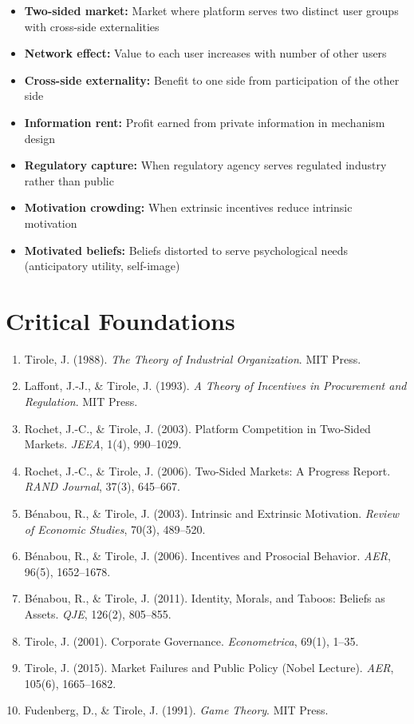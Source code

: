 \begin{itemize}
    \item \textbf{Two-sided market:} Market where platform serves two distinct user groups with cross-side externalities
    \item \textbf{Network effect:} Value to each user increases with number of other users
    \item \textbf{Cross-side externality:} Benefit to one side from participation of the other side
    \item \textbf{Information rent:} Profit earned from private information in mechanism design
    \item \textbf{Regulatory capture:} When regulatory agency serves regulated industry rather than public
    \item \textbf{Motivation crowding:} When extrinsic incentives reduce intrinsic motivation
    \item \textbf{Motivated beliefs:} Beliefs distorted to serve psychological needs (anticipatory utility, self-image)
\end{itemize}

\section{Critical Foundations}
\label{sec:jt-foundations}

\begin{enumerate}
    \item Tirole, J. (1988). \textit{The Theory of Industrial Organization}. MIT Press.
    \item Laffont, J.-J., \& Tirole, J. (1993). \textit{A Theory of Incentives in Procurement and Regulation}. MIT Press.
    \item Rochet, J.-C., \& Tirole, J. (2003). Platform Competition in Two-Sided Markets. \textit{JEEA}, 1(4), 990--1029.
    \item Rochet, J.-C., \& Tirole, J. (2006). Two-Sided Markets: A Progress Report. \textit{RAND Journal}, 37(3), 645--667.
    \item Bénabou, R., \& Tirole, J. (2003). Intrinsic and Extrinsic Motivation. \textit{Review of Economic Studies}, 70(3), 489--520.
    \item Bénabou, R., \& Tirole, J. (2006). Incentives and Prosocial Behavior. \textit{AER}, 96(5), 1652--1678.
    \item Bénabou, R., \& Tirole, J. (2011). Identity, Morals, and Taboos: Beliefs as Assets. \textit{QJE}, 126(2), 805--855.
    \item Tirole, J. (2001). Corporate Governance. \textit{Econometrica}, 69(1), 1--35.
    \item Tirole, J. (2015). Market Failures and Public Policy (Nobel Lecture). \textit{AER}, 105(6), 1665--1682.
    \item Fudenberg, D., \& Tirole, J. (1991). \textit{Game Theory}. MIT Press.
\end{enumerate}

